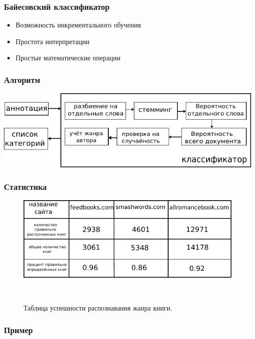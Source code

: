 \documentclass[utf8,handout]{beamer}
\begin{document}
\begin{frame}
	\frametitle{Байесовский классификатор}
	  \begin{itemize}
	    \item Возможность инкрементального обучения
	    \item Простота интерпретации
	    \item Простые математические операции
	  \end{itemize}
	   		  
\end{frame}


\begin{frame}
	\frametitle{Алгоритм}
      \includegraphics[width=1.05\textwidth]{./classifier}
\end{frame}


\begin{frame}
	\frametitle{Статистика}
   \begin{figure}
	  \centering
	  \includegraphics[width=.7\textwidth]{./statistics}
	  
	  \ 
	  \ 
	  
	  Таблица успешности распознавания жанра книги.
   \end{figure} 
\end{frame}

\begin{frame}
	\frametitle{Пример}
    
\end{frame}
\end{document}
